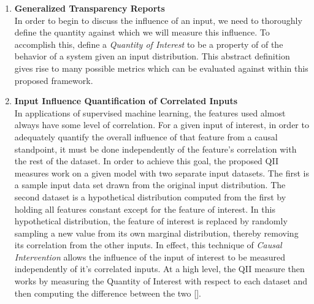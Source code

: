     \begin{enumerate}
        \item \textbf{Generalized Transparency Reports} \\
        In order to begin to discuss the influence of an input, we need to thoroughly define the quantity against which we will measure this influence. To accomplish this, \citet{QII_MS3} define a \textit{Quantity of Interest} to be a property of of the behavior of a system given an input distribution. This abstract definition gives rise to many possible metrics which can be evaluated against within this proposed framework.
        
        \item \textbf{Input Influence Quantification of Correlated Inputs} \\
        \label{sec:QII.2}
        In applications of supervised machine learning, the features used almost always have some level of correlation. For a given input of interest, in order to adequately quantify the overall influence of that feature from a causal standpoint, it must be done independently of the feature's correlation with the rest of the dataset. In order to achieve this goal, the proposed QII measures work on a given model with two separate input datasets. The first is a sample input data set drawn from the original input distribution. The second dataset is a hypothetical distribution computed from the first by holding all features constant except for the feature of interest. In this hypothetical distribution, the feature of interest is replaced by randomly sampling a new value from its own marginal distribution, thereby removing its correlation from the other inputs. In effect, this technique of \textit{Causal Intervention} allows the influence of the input of interest to be measured independently of it's correlated inputs.  At a high level, the QII measure then works by measuring the Quantity of Interest with respect to each dataset and then computing the difference between the two [].
        

\end{enumerate}
